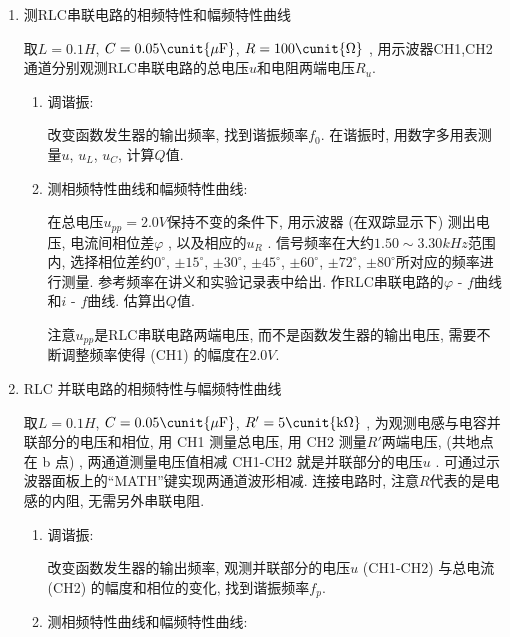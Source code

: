 \documentclass[11pt]{article}
\begin{document}
\begin{enumerate}

\item 测RLC串联电路的相频特性和幅频特性曲线

取$L =0.1 H$, $C =0.05 \cunit{\mu\mathrm{F}}$, $R =100\cunit{\Omega}$ , 用示波器CH1,CH2通道分别观测RLC串联电路的总电压$u$和电阻两端电压$R_u$.

    \begin{enumerate}

    \item 调谐振:
    
    改变函数发生器的输出频率, 找到谐振频率$f_0$. 在谐振时, 用数字多用表测量$u$, $u_L$, $u_C$, 计算$Q$值. 
    
    \item 测相频特性曲线和幅频特性曲线:
    
    在总电压$u_{pp} = 2.0\unit{V}$保持不变的条件下, 用示波器 (在双踪显示下) 测出电压, 电流间相位差$\varphi$ , 以及相应的$u_R$ . 信号频率在大约$1.50 \sim 3.30 \unit{kHz}$范围内, 选择相位差约$0^\circ$, $\pm 15^\circ$, $\pm 30^\circ$, $\pm 45^\circ$, $\pm 60^\circ$, $\pm 72^\circ$, $\pm 80^\circ$所对应的频率进行测量. 参考频率在讲义和实验记录表中给出. 作RLC串联电路的$\varphi \mbox{ - } f$曲线和$i \mbox{ - } f$曲线. 估算出$Q$值. 

    注意$u_{pp}$是RLC串联电路两端电压, 而不是函数发生器的输出电压, 需要不断调整频率使得 (CH1) 的幅度在$2.0\unit{V}$.

    \end{enumerate}

\item RLC 并联电路的相频特性与幅频特性曲线

取$L =0.1 H$, $C =0.05 \cunit{\mu\mathrm{F}}$, $R' = 5\cunit{\mathrm{k}\Omega}$ , 为观测电感与电容并联部分的电压和相位, 用 CH1 测量总电压, 用 CH2 测量$R'$两端电压,  (共地点在 b 点) , 两通道测量电压值相减 CH1-CH2 就是并联部分的电压$u$ . 可通过示波器面板上的“MATH”键实现两通道波形相减. 连接电路时, 注意$R$代表的是电感的内阻, 无需另外串联电阻.
    
     \begin{enumerate}

    \item 调谐振:
        
    改变函数发生器的输出频率, 观测并联部分的电压$u$  (CH1-CH2) 与总电流 (CH2) 的幅度和相位的变化, 找到谐振频率$f_p$. 
        
    \item 测相频特性曲线和幅频特性曲线:
        

\end{enumerate}
\end{enumerate}
\end{document}
